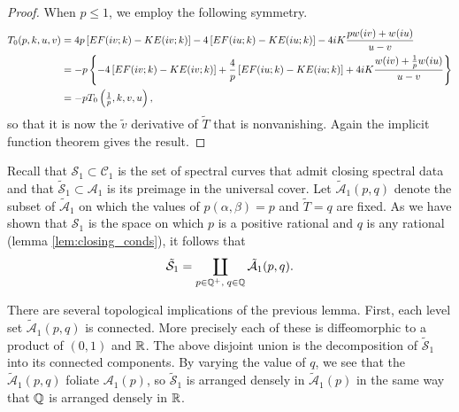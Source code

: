 \begin{lem}
\begin{proof}
When $p \leq 1$, we employ the following symmetry.
\begin{align*}
T_0(p,k,u,v)
&= 4p \left[ E F(i v;k) - K E(i v;k) \right] - 4\left[ E F(i u;k) - K E(i u;k) \right] - 4i K \frac{p w(i v) + w(i u)}{u-v} \\
&= -p\left\{ -4\left[ E F(i v;k) - K E(i v;k) \right] + \frac{4}{p}\left[ E F(i u;k) - K E(i u;k) \right] + 4i K \frac{ w(i v) + \frac{1}{p}w(i u)}{u-v} \right\}\\
&= -p T_0\left( \tfrac{1}{p}, k, v, u \right),
\end{align*}
so that it is now the $\tilde{v}$ derivative of $\tilde{T}$ that is nonvanishing. Again the implicit function theorem gives the result.
\end{proof}
\end{lem}

Recall that $\mathcal{S}_1 \subset \mathcal{C}_1$ is the set of spectral curves that admit closing spectral data and that $\mathcal{\tilde{S}}_1 \subset \mathcal{\mathcal{A}_1}$ is its preimage in the universal cover. Let $\mathcal{\tilde{A}}_1(p,q)$ denote the subset of $\mathcal{\tilde{A}}_1$ on which the values of $p(α,β) = p$ and $\tilde{T} = q$ are fixed. As we have shown that $\mathcal{S}_1$ is the space on which $p$ is a positive rational and $q$ is any rational (lemma \ref{lem:closing_conds}), it follows that
\[
\mathcal{\tilde{S}}_1 = \coprod_{p\in \mathbb{Q}^+,\; q\in \mathbb{Q}} \mathcal{\tilde{A}}_1(p,q).
\]

There are several topological implications of the previous lemma. First, each level set $\mathcal{\tilde{A}}_1(p,q)$ is connected. More precisely each of these is diffeomorphic to a product of $(0,1)$ and $\mathbb{R}$. The above disjoint union is the decomposition of $\mathcal{\tilde{S}}_1$ into its connected components. By varying the value of $q$, we see that the $\mathcal{\tilde{A}}_1(p,q)$ foliate $\mathcal{A}_1(p)$, so $\mathcal{\tilde{S}}_1$ is arranged densely in $\mathcal{\tilde{A}}_1(p)$ in the same way that $\mathbb{Q}$ is arranged densely in $\mathbb{R}$.

